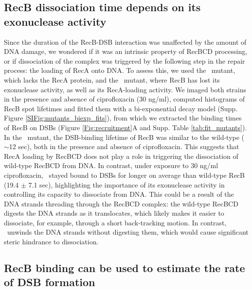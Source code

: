 \subsection*{RecB dissociation time depends on its exonuclease activity}
Since the duration of the RecB-DSB interaction was unaffected by the amount of DNA damage, we wondered if it was an intrinsic property of RecBCD processing, or if dissociation of the complex was triggered by the following step in the repair process: the loading of RecA onto DNA. To assess this, we used the \dreca\ mutant, which lacks the RecA protein, and the \geneteneighty\ mutant, where RecB has lost its exonuclease activity, as well as its RecA-loading activity. We imaged both strains in the presence and absence of ciprofloxacin (30 ng/ml), computed histograms of RecB spot lifetimes and fitted them with a bi-exponential decay model (Supp. Figure \ref{SIFig:mutants_biexp_fits}), from which we extracted the binding times of RecB on DSBs (Figure \ref{Fig:recruitment}A and Supp. Table \ref{tab:fit_mutants}). In the \dreca\ mutant, the DSB-binding lifetime of RecB was similar to the wild-type ($\sim$12 sec), both in the presence and absence of ciprofloxacin. This suggests that RecA loading by RecBCD does not play a role in triggering the dissociation of wild-type RecBCD from DNA. In contrast, under exposure to 30 ng/ml ciprofloxacin, \teneighty\ stayed bound to DSBs for longer on average than wild-type RecB (19.4 $\pm$ 7.1 sec), highlighting the importance of its exonuclease activity in controlling its capacity to dissociate from DNA. This could be a result of the DNA strands threading through the RecBCD complex: the wild-type RecBCD digests the DNA strands as it translocates, which likely makes it easier to dissociate, for example, through a short back-tracking motion. In contrast, \teneighty\ unwinds the DNA strands without digesting them, which would cause significant steric hindrance to dissociation.

\subsection*{RecB binding can be used to estimate the rate of DSB formation}

